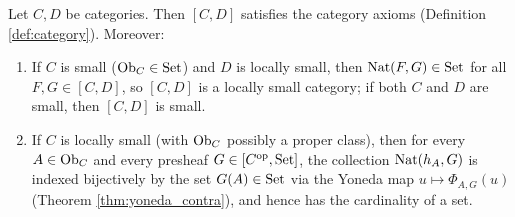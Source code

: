 \documentclass[10pt,a4paper]{article}
\begin{document}
\begin{lemma}\label{lem:fun_cat}
Let $C, D$ be categories. Then $[C, D]$ satisfies the category axioms (Definition \ref{def:category}). Moreover:
\begin{enumerate}
\item[(a)] If $C$ is small (${\textrm{Ob}}_C \in {\textrm{Set}}$) and $D$ is locally small, then ${\textrm{Nat}}(F, G) \in {\textrm{Set}}$ for all $F, G \in [C, D]$, so $[C, D]$ is a locally small category; if both $C$ and $D$ are small, then $[C, D]$ is small.
\item[(b)] If $C$ is locally small (with ${\textrm{Ob}}_C$ possibly a proper class), then for every $A \in {\textrm{Ob}}_C$ and every presheaf $G \in [C^{\textrm{op}}, {\textrm{Set}}]$, the collection ${\textrm{Nat}}(h_A, G)$ is indexed bijectively by the set $G(A) \in {\textrm{Set}}$ via the Yoneda map $u \mapsto \Phi_{A,G}(u)$ (Theorem \ref{thm:yoneda_contra}), and hence has the cardinality of a set.
\end{enumerate}
\end{lemma}
\myprf
\end{document}
